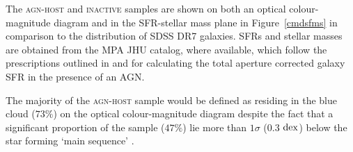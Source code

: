 The \textsc{agn-host} and \textsc{inactive}  samples are shown on both an optical colour-magnitude diagram and in the SFR-stellar mass plane in Figure~\ref{cmdsfms} in comparison to the distribution of SDSS DR7 galaxies. SFRs and stellar masses are obtained from the MPA JHU catalog, where available, which follow the prescriptions outlined in \cite{brinchmann04} and \cite{Salim07} for calculating the total aperture corrected galaxy SFR in the presence of an AGN. 

The majority of the \textsc{agn-host} sample would be defined as residing in the blue cloud ($73\%$) on the optical colour-magnitude diagram despite the fact that a significant proportion of the sample ($47\%$) lie more than $1\sigma$ ($0.3$ $\rm{dex}$) below the star forming `main sequence' \citep[][see Figure \ref{cmdsfms} and Table~\ref{table:agnqsubs}]{peng10}.

